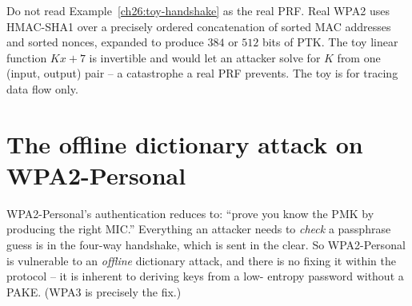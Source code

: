 \begin{trapbox}
Do not read Example~\ref{ch26:toy-handshake} as the real PRF. Real WPA2 uses
HMAC-SHA1 over a precisely ordered concatenation of sorted MAC addresses and
sorted nonces, expanded to produce $384$ or $512$ bits of PTK. The toy linear
function $K x + 7$ is invertible and would let an attacker solve for $K$ from one
(input, output) pair -- a catastrophe a real PRF prevents. The toy is for tracing
data flow only.
\end{trapbox}

\section{The offline dictionary attack on WPA2-Personal}

WPA2-Personal's authentication reduces to: ``prove you know the PMK by
producing the right MIC.'' Everything an attacker needs to \emph{check} a
passphrase guess is in the four-way handshake, which is sent in the clear. So
WPA2-Personal is vulnerable to an \emph{offline} dictionary attack, and there is
no fixing it within the protocol -- it is inherent to deriving keys from a low-
entropy password without a PAKE. (WPA3 is precisely the fix.)

